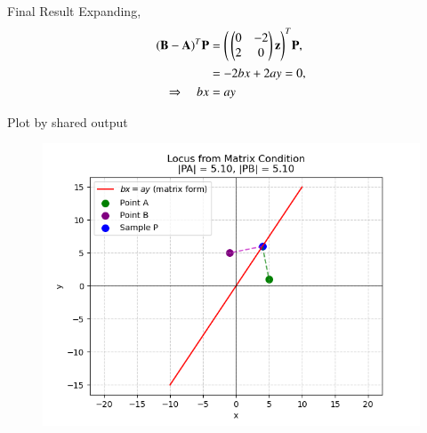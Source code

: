 \documentclass{beamer}
\begin{document}
\begin{frame}{Final Result}
Expanding,
\begin{align}
(\mathbf{B}-\mathbf{A})^T\mathbf{P} 
&= \Bigg(\begin{pmatrix}0 & -2 \\ 2 & 0\end{pmatrix}\mathbf{z}\Bigg)^T \mathbf{P}, \\
&= -2bx + 2ay = 0, \\
\Rightarrow \quad bx &= ay
\end{align}
\end{frame}
















\begin{frame}{Plot by shared output}
    

\begin{figure}
    \centering
    \includegraphics[width=0.9\columnwidth]{figs/Fig1.png}
    \caption{}
    \label{fig:placeholder}
\end{figure}
\end{frame}
\end{document}
